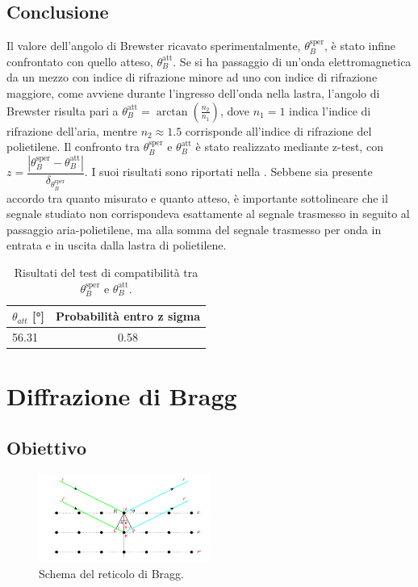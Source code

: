 \documentclass[a4paper]{article}
\begin{document}
\subsection{Conclusione}
Il valore dell'angolo di Brewster ricavato sperimentalmente, $\theta_B^{\text{sper}}$, è stato infine confrontato con quello atteso, $\theta_B^{\text{att}}$. Se si ha passaggio di un'onda elettromagnetica da un mezzo con indice di rifrazione minore ad uno con indice di rifrazione maggiore, come avviene durante l'ingresso dell'onda nella lastra, l'angolo di Brewster risulta pari a $\theta_B^{\text{att}} = \arctan\left(\frac{n_2}{n_1}\right)$, dove $n_1 = 1$ indica l'indice di rifrazione dell'aria, mentre $n_2 \approx 1.5$ corrisponde all'indice di rifrazione del polietilene. Il confronto tra $\theta_B^{\text{sper}}$ e $\theta_B^{\text{att}}$ è stato realizzato mediante z-test, con $z = \dfrac{|\theta_B^{\text{sper}} - \theta_B^{\text{att}}|}{\delta_{\theta_B^{\text{sper}}}}$. I suoi risultati sono riportati nella . Sebbene sia presente accordo tra quanto misurato e quanto atteso, è importante sottolineare che il segnale studiato non corrispondeva esattamente al segnale trasmesso in seguito al passaggio aria-polietilene, ma alla somma del segnale trasmesso per onda in entrata e in uscita dalla lastra di polietilene.
\begin{table}[htbp] 
\centering
\begin{tabular}{|l|c|}
\hline
$\theta_{att}$ [\si{\degree}] & Probabilità entro z sigma \\
\hline
56.31 & 0.58 \\
\bottomrule
\end{tabular}
\caption{Risultati del test di compatibilità tra $\theta_B^{\text{sper}}$ e $\theta_B^{\text{att}}$.}
\label{tab:brewster_compatibilita}
\end{table}


\section{Diffrazione di Bragg}
\subsection{Obiettivo}
\begin{figure}[htbp]
	\centering
	\includegraphics[width=0.5\textwidth]{grafici/schema.bragg.png}
	\caption{Schema del reticolo di Bragg.}
	\label{fig:schema_bragg}
\end{figure}
\end{document}
